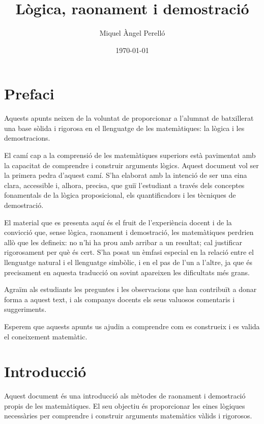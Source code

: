 \documentclass[12pt,a4paper,oneside]{book}
\begin{document}
\pagecolor{fons!20}
\frontmatter
\title{Lògica, raonament i demostració}
\author{Miquel Àngel Perelló}
\date{\today}
\maketitle
\tableofcontents

\let\cleardoublepage\clearpage
\chapter*{Prefaci}

Aquests apunts neixen de la voluntat de proporcionar a l'alumnat de batxillerat una base sòlida i rigorosa en el llenguatge de les matemàtiques: la lògica i les demostracions.

El camí cap a la comprensió de les matemàtiques superiors està pavimentat amb la capacitat de comprendre i construir arguments lògics. Aquest document vol ser la primera pedra d'aquest camí. S'ha elaborat amb la intenció de ser una eina clara, accessible i, alhora, precisa, que guiï l'estudiant a través dels conceptes fonamentals de la lògica proposicional, els quantificadors i les tècniques de demostració.

El material que es presenta aquí és el fruit de l'experiència docent i de la convicció que, sense lògica, raonament i demostració, les matemàtiques perdrien allò que les defineix: no n'hi ha prou amb arribar a un resultat; cal justificar rigorosament per què és cert. S'ha posat un èmfasi especial en la relació entre el llenguatge natural i el llenguatge simbòlic, i en el pas de l'un a l'altre, ja que és precisament en aquesta traducció on sovint apareixen les dificultats més grans.

Agraïm als estudiants les preguntes i les observacions que han contribuït a donar forma a aquest text, i als companys docents els seus valuosos comentaris i suggeriments.

Esperem que aquests apunts us ajudin a comprendre com es construeix i es valida el coneixement matemàtic.

\let\cleardoublepage\clearpage
\chapter{Introducció}

Aquest document és una introducció als mètodes de raonament i demostració propis de les matemàtiques. El seu objectiu és proporcionar les eines lògiques necessàries per comprendre i construir arguments matemàtics vàlids i rigorosos.
\end{document}
